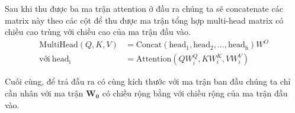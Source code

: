 \begin{enumerate}[label=\textbf{\arabic*}]
          Sau khi thu được ba ma trận attention ở đầu ra chúng ta sẽ concatenate các matrix này theo các cột để thu được ma trận tổng hợp multi-head matrix có chiều cao trùng với chiều cao của ma trận đầu vào.
          \begin{align}
              \mathrm{MultiHead}(Q, K, V) & = \mathrm{Concat}(\mathrm{head_1},\mathrm{head_2}, ..., \mathrm{head_h})W^O \\
              \text{với}~\mathrm{head_i}  & = \mathrm{Attention}(QW^Q_i, KW^K_i, VW^V_i)
          \end{align}


          Cuối cùng, để trả đầu ra có cùng kích thước với ma trận ban đầu chúng ta chỉ cần nhân với ma trận $\mathbf{W}_\mathbf{0}$ có chiều rộng bằng với chiều rộng của ma trận đầu vào.
\end{enumerate}
